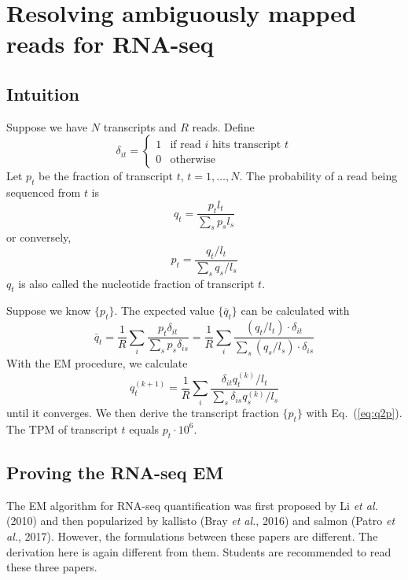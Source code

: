 \documentclass[10pt]{article}
\begin{document}
\newpage

\section{Resolving ambiguously mapped reads for RNA-seq}

\subsection{Intuition}
Suppose we have $N$ transcripts and $R$ reads.
Define
$$
\delta_{it}=\left\{\begin{array}{ll}
1 & \mbox{if read $i$ hits transcript $t$} \\
0 & \mbox{otherwise}
\end{array}\right.
$$
Let $p_t$ be the fraction of transcript $t$, $t=1,\ldots,N$.
The probability of a read being sequenced from $t$ is
\begin{equation}\label{eq:p2q}
q_t=\frac{p_tl_t}{\sum_s{p_sl_s}}
\end{equation}
or conversely,
\begin{equation}\label{eq:q2p}
p_t=\frac{q_t/l_t}{\sum_s q_s/l_s}
\end{equation}
$q_t$ is also called the nucleotide fraction of transcript $t$.

Suppose we know $\{p_t\}$. The expected value $\{\bar{q}_t\}$ can be calculated with
$$
\bar{q}_t=\frac{1}{R}\sum_i\frac{p_t\delta_{it}}{\sum_s{p_s\delta_{is}}}
=\frac{1}{R}\sum_i\frac{(q_t/l_t)\cdot\delta_{it}}{\sum_s{(q_s/l_s)\cdot\delta_{is}}}
$$
With the EM procedure, we calculate
\begin{equation}\label{eq:rna-em}
q_t^{(k+1)}=\frac{1}{R}\sum_i\frac{\delta_{it}q_t^{(k)}/l_t}{\sum_s{\delta_{is}q_s^{(k)}/l_s}}
\end{equation}
until it converges.
We then derive the transcript fraction $\{p_t\}$ with Eq.~(\ref{eq:q2p}).
The TPM of transcript $t$ equals $p_t\cdot10^6$.

\subsection{Proving the RNA-seq EM}

The EM algorithm for RNA-seq quantification was first proposed by Li \emph{et
al.} (2010) and then popularized by kallisto (Bray \emph{et al.}, 2016) and
salmon (Patro \emph{et al.}, 2017).
However, the formulations between these papers are different.
The derivation here is again different from them.
Students are recommended to read these three papers.
\end{document}
